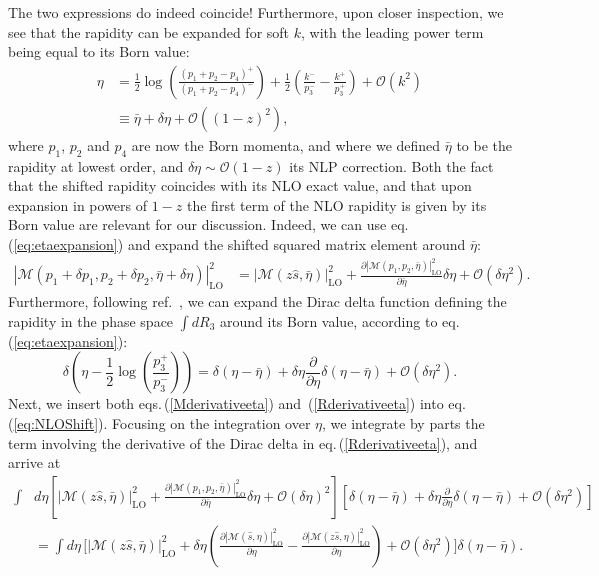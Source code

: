 \documentclass[11pt]{article}
\newcommand{\be}{\begin{equation}}
\newcommand{\ee}{\end{equation}}
\newcommand{\nn}{\nonumber}
\newcommand{\M}{\mathcal{M}}
\newcommand{\s}{\hat{s}}
\newcommand\eqn[1]     {eq.\,(\ref{#1})}
\newcommand\eqns[2]    {eqs.\,(\ref{#1}) and~(\ref{#2})}
\begin{document}
The two expressions do indeed coincide! Furthermore, 
upon closer inspection, we see that the rapidity can 
be expanded for soft $k$, with the leading power term
being equal to its Born value:
\begin{align}\label{eq:etaexpansion}
\eta &= \frac{1}{2}\log\left(\frac{(p_1+p_2-p_4)^+}{(p_1+p_2-p_4)^-}\right)+\frac12\left(\frac{k^-}{p_3^-}-\frac{k^+}{p_3^+}\right)+\mathcal{O}(k^2)\nonumber \\
&\equiv\bar{\eta}+\delta\eta+\mathcal{O}\left((1-z)^2\right),
\end{align}
where $p_1$, $p_2$ and $p_4$ are now the Born momenta, 
and where we defined $\bar{\eta}$ to be the rapidity 
at lowest order, and $\delta\eta \sim \mathcal{O}(1-z)$ 
its NLP correction. Both the fact that the shifted rapidity 
coincides with its NLO exact value, and that upon expansion 
in powers of $1-z$ the first term of the NLO rapidity is given by its Born value are relevant for our
discussion. Indeed, we can use \eqn{eq:etaexpansion} 
and expand the shifted squared matrix element around $\bar\eta$:
\begin{align}
\left|\M(p_1+\delta p_1,p_2+\delta p_2,\bar{\eta}+\delta\eta)\right|_\text{LO}^2 &=\left|\M(z\s,\bar{\eta})\right|_\text{LO}^2+\frac{\partial\left|\M(p_1,p_2,\bar{\eta})\right|_\text{LO}^2}{\partial\bar{\eta}}\delta\eta+\mathcal{O}(\delta\eta^2)\label{Mderivativeeta}.
\end{align}
Furthermore, following ref.~\cite{Laenen:1992ey}, we 
can expand the Dirac delta function defining the 
rapidity in the phase space $\int dR_3$ around its Born 
value, according to \eqn{eq:etaexpansion}:
\be \label{Rderivativeeta}
\delta\left(\eta-\frac12\log\left(\frac{p_3^+}{p_3^-}\right)\right) = \delta(\eta- \bar{\eta})+\delta\eta
\frac{\partial}{\partial \eta}\delta(\eta-\bar{\eta}) +\mathcal{O}(\delta\eta^2).
\ee
Next, we insert both \eqns{Mderivativeeta}{Rderivativeeta}
into \eqn{eq:NLOShift}. Focusing on the integration over $\eta$, we integrate by parts the term involving the 
derivative of the Dirac delta in \eqn{Rderivativeeta}, 
and arrive at 
\begin{align} \nn
\int & d\eta  \left[|\mathcal{M}(z\hat{s},\bar{\eta})|_\text{LO}^2+\frac{\partial |\mathcal{M}(p_1,p_2,\bar{\eta})|^2_\text{LO}}{\partial \bar{\eta}}\delta\eta+\mathcal{O}(\delta\eta)^2\right]
\left[\delta(\eta- \bar{\eta})+\delta\eta
\frac{\partial}{\partial \eta}\delta(\eta-\bar{\eta}) +\mathcal{O}(\delta\eta^2)\right] \\[0.2cm]
&=\int d\eta\, \bigg[|\mathcal{M}(z\hat{s},\bar \eta)|_\text{LO}^2+\delta\eta\left(\frac{\partial |\M(\hat{s},\eta)|_\text{LO}^2}{\partial \eta}-\frac{\partial |\M(z\hat{s},\eta)|_\text{LO}^2}{\partial \eta}\right)+\mathcal{O}(\delta\eta^2)\bigg] \delta(\eta-\bar{\eta}). \label{shiftderivative0}
\end{align}
\end{document}
